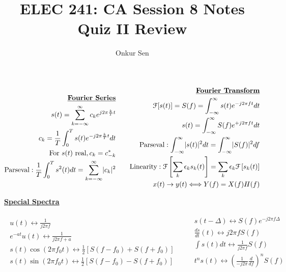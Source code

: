 \documentclass[11pt]{article}
\title{ELEC 241: CA Session 8 Notes\\Quiz II Review}
\author{Onkur Sen}
\date{}
\newcommand{\abs}[1]{\lvert #1 \rvert}
\begin{document}
\maketitle

\begin{eqnarray*}
\begin{split}
\mbox{{\bf \underline{Fourier Series}}}\\
s(t) = \sum_{k=-\infty}^{\infty} c_k e^{j 2 \pi \frac{k}{T} t}\\
c_k = \frac{1}{T} \int_0^T s(t) e^{-j 2 \pi \frac{k}{T} t} dt \\
\mbox{For $s(t)$ real}, c_k = c_{-k}^{*}\\
\mbox{Parseval}: \frac{1}{T} \int_0^T s^2(t) dt = \sum_{k=-\infty}^{\infty} \abs{c_k}^2\\
\end{split}
\qquad
\begin{split}
\mbox{{\bf \underline{Fourier Transform}}}\\
\mathcal{F}[s(t)] = S(f) = \int_{-\infty}^{\infty} s(t) e^{-j 2 \pi f t} dt \\
s(t) = \int_{-\infty}^{\infty} S(f) e^{+j 2 \pi f t} dt \\
\mbox{Parseval}: \int_{-\infty}^{\infty} \abs{s(t)}^2 dt = \int_{-\infty}^{\infty} \abs{S(f)}^2 df\\
\mbox{Linearity}: \mathcal{F}\left[\sum_k \epsilon_k s_k(t)\right] = \sum_k \epsilon_k \mathcal{F}\left[s_k(t)\right]\\
x(t) \to y(t) \Longleftrightarrow Y(f) = X(f)H(f)\\
\end{split}
\end{eqnarray*}

\begin{center}
{\bf \underline{Special Spectra}}
\end{center}
\vspace{-5mm}
\begin{eqnarray*}
\begin{split}
u(t) \longleftrightarrow \frac{1}{j 2 \pi f}\\
e^{-at} u(t) \longleftrightarrow \frac{1}{j 2 \pi f + a}\\
s(t)\cos(2\pi f_0 t) \longleftrightarrow \frac{1}{2}\left[ S(f-f_0) + S(f+f_0) \right]\\
s(t)\sin(2\pi f_0 t) \longleftrightarrow \frac{1}{2}\left[ S(f-f_0) - S(f+f_0) \right]\\
\end{split}
\qquad
\begin{split}
s(t-\Delta) \longleftrightarrow S(f) e^{-j2 \pi f\Delta}\\
\frac{ds}{dt}(t) \longleftrightarrow j2\pi f S(f)\\
\int s(t) dt \longleftrightarrow \frac{1}{j 2 \pi f} S(f)\\
t^n s(t) \longleftrightarrow \left( \frac{1}{-j 2 \pi} \frac{d}{df} \right)^n S(f)\\ 
\end{split}
\end{eqnarray*}
\end{document}
